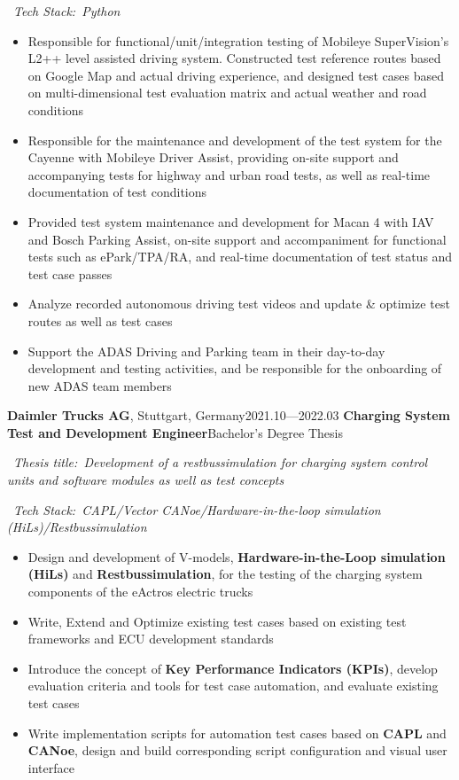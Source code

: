 \documentclass{resume}
\begin{document}
\ \textit{Tech Stack:\ Python}
\begin{itemize}
  \item Responsible for functional/unit/integration testing of Mobileye SuperVision's L2++ level assisted driving system. Constructed test reference routes based on Google Map and actual driving experience, and designed test cases based on multi-dimensional test evaluation matrix and actual weather and road conditions
  \item Responsible for the maintenance and development of the test system for the Cayenne with Mobileye Driver Assist, providing on-site support and accompanying tests for highway and urban road tests, as well as real-time documentation of test conditions
  \item Provided test system maintenance and development for Macan 4 with IAV and Bosch Parking Assist, on-site support and accompaniment for functional tests such as ePark/TPA/RA, and real-time documentation of test status and test case passes
  \item Analyze recorded autonomous driving test videos and update \& optimize test routes as well as test cases
  \item Support the ADAS Driving and Parking team in their day-to-day development and testing activities, and be responsible for the onboarding of new ADAS team members
\end{itemize}
\vspace{0.15cm}

\worksubsection
  {\textbf{Daimler Trucks AG}, Stuttgart, Germany}{2021.10—2022.03}
\workpossubsection
  {\textbf{Charging System Test and Development Engineer}}{Bachelor's Degree Thesis}

\ \textit{Thesis title:\ Development of a restbussimulation for charging system control units and software modules as well as test concepts}

\ \textit{Tech Stack:\ CAPL/Vector CANoe/Hardware-in-the-loop simulation (HiLs)/Restbussimulation}
\begin{itemize}
  \item Design and development of V-models, \textbf{Hardware-in-the-Loop simulation (HiLs)} and \textbf{Restbussimulation}, for the testing of the charging system components of the eActros electric trucks
  \item Write, Extend and Optimize existing test cases based on existing test frameworks and ECU development standards
  \item Introduce the concept of \textbf{Key Performance Indicators (KPIs)}, develop evaluation criteria and tools for test case automation, and evaluate existing test cases
  \item Write implementation scripts for automation test cases based on \textbf{CAPL} and \textbf{CANoe}, design and build corresponding script configuration and visual user interface
\end{itemize}
\vspace{0.15cm}
\end{document}
